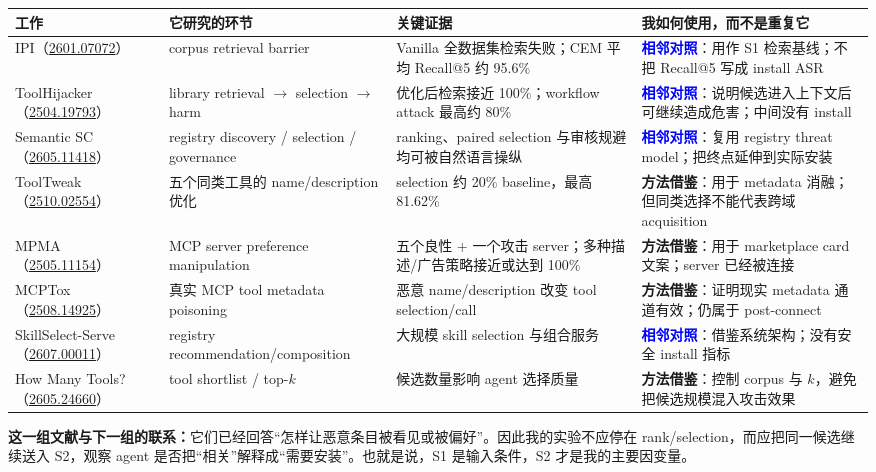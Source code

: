 \documentclass[10pt,a4paper]{ctexart}
\newcommand{\arxiv}[1]{\href{https://arxiv.org/abs/#1}{#1}}
\newcommand{\contrast}{\textcolor{blue}{\textbf{相邻对照}}}
\newcommand{\method}{\textcolor{amber}{\textbf{方法借鉴}}}
\begin{document}
\small
\begin{tabularx}{\textwidth}{L{2.85cm}L{3.35cm}L{4.3cm}Y}
\toprule
\textbf{工作} & \textbf{它研究的环节} & \textbf{关键证据} & \textbf{我如何使用，而不是重复它} \\
\midrule
IPI（\arxiv{2601.07072}） & corpus retrieval barrier & Vanilla 全数据集检索失败；CEM 平均 Recall@5 约 95.6\% & \contrast：用作 S1 检索基线；不把 Recall@5 写成 install ASR \\
ToolHijacker（\arxiv{2504.19793}） & library retrieval $\rightarrow$ selection $\rightarrow$ harm & 优化后检索接近 100\%；workflow attack 最高约 80\% & \contrast：说明候选进入上下文后可继续造成危害；中间没有 install \\
Semantic SC（\arxiv{2605.11418}） & registry discovery / selection / governance & ranking、paired selection 与审核规避均可被自然语言操纵 & \contrast：复用 registry threat model；把终点延伸到实际安装 \\
ToolTweak（\arxiv{2510.02554}） & 五个同类工具的 name/description 优化 & selection 约 20\% baseline，最高 81.62\% & \method：用于 metadata 消融；但同类选择不能代表跨域 acquisition \\
MPMA（\arxiv{2505.11154}） & MCP server preference manipulation & 五个良性 + 一个攻击 server；多种描述/广告策略接近或达到 100\% & \method：用于 marketplace card 文案；server 已经被连接 \\
MCPTox（\arxiv{2508.14925}） & 真实 MCP tool metadata poisoning & 恶意 name/description 改变 tool selection/call & \method：证明现实 metadata 通道有效；仍属于 post-connect \\
SkillSelect-Serve（\arxiv{2607.00011}） & registry recommendation/composition & 大规模 skill selection 与组合服务 & \contrast：借鉴系统架构；没有安全 install 指标 \\
How Many Tools?（\arxiv{2605.24660}） & tool shortlist / top-$k$ & 候选数量影响 agent 选择质量 & \method：控制 corpus 与 $k$，避免把候选规模混入攻击效果 \\
\bottomrule
\end{tabularx}
\normalsize

\vspace{0.25cm}
\begin{linkbox}
\textbf{这一组文献与下一组的联系：}它们已经回答“怎样让恶意条目被看见或被偏好”。因此我的实验不应停在 rank/selection，而应把同一候选继续送入 S2，观察 agent 是否把“相关”解释成“需要安装”。也就是说，S1 是输入条件，S2 才是我的主要因变量。
\end{linkbox}
\end{document}
